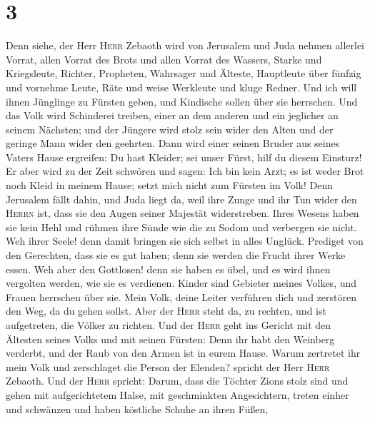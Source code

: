 \hypertarget{section-2}{%
\section{3}\label{section-2}}

 Denn siehe, der Herr \textsc{Herr} Zebaoth wird von
Jerusalem und Juda nehmen allerlei Vorrat, allen Vorrat des Brots und
allen Vorrat des Wassers,  Starke und Kriegsleute,
Richter, Propheten, Wahrsager und Älteste,  Hauptleute
über fünfzig und vornehme Leute, Räte und weise Werkleute und kluge
Redner.  Und ich will ihnen Jünglinge zu Fürsten geben,
und Kindische sollen über sie herrschen.  Und das Volk
wird Schinderei treiben, einer an dem anderen und ein jeglicher an
seinem Nächsten; und der Jüngere wird stolz sein wider den Alten und der
geringe Mann wider den geehrten.  Dann wird einer seinen
Bruder aus seines Vaters Hause ergreifen: Du hast Kleider; sei unser
Fürst, hilf du diesem Einsturz!  Er aber wird zu der Zeit
schwören und sagen: Ich bin kein Arzt; es ist weder Brot noch Kleid in
meinem Hause; setzt mich nicht zum Fürsten im Volk!  Denn
Jerusalem fällt dahin, und Juda liegt da, weil ihre Zunge und ihr Tun
wider den \textsc{Herrn} ist, dass sie den Augen seiner Majestät
widerstreben.  Ihres Wesens haben sie kein Hehl und rühmen
ihre Sünde wie die zu Sodom und verbergen sie nicht. Weh ihrer Seele!
denn damit bringen sie sich selbst in alles Unglück. 
Prediget von den Gerechten, dass sie es gut haben; denn sie werden die
Frucht ihrer Werke essen.  Weh aber den Gottlosen! denn
sie haben es übel, und es wird ihnen vergolten werden, wie sie es
verdienen.  Kinder sind Gebieter meines Volkes, und
Frauen herrschen über sie. Mein Volk, deine Leiter verführen dich und
zerstören den Weg, da du gehen sollst.  Aber der
\textsc{Herr} steht da, zu rechten, und ist aufgetreten, die Völker zu
richten.  Und der \textsc{Herr} geht ins Gericht mit den
Ältesten seines Volks und mit seinen Fürsten: Denn ihr habt den Weinberg
verderbt, und der Raub von den Armen ist in eurem Hause. 
Warum zertretet ihr mein Volk und zerschlaget die Person der Elenden?
spricht der Herr \textsc{Herr} Zebaoth.  Und der
\textsc{Herr} spricht: Darum, dass die Töchter Zions stolz sind und
gehen mit aufgerichtetem Halse, mit geschminkten Angesichtern, treten
einher und schwänzen und haben köstliche Schuhe an ihren Füßen,

